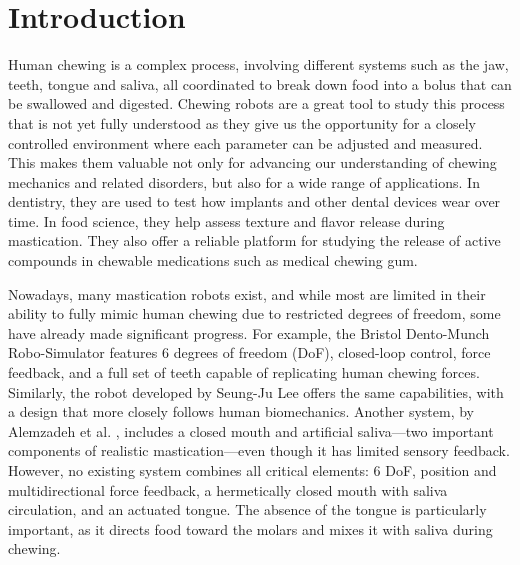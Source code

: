 \section{Introduction}


Human chewing is a complex process, involving different systems such as the jaw, teeth, tongue and saliva, all coordinated to break down food into 
a bolus that can be swallowed and digested. Chewing robots are a great tool to study this process that is not yet fully understood as they give us the opportunity 
for a closely controlled environment where each parameter can be adjusted and measured. This makes them valuable not only for advancing our understanding of 
chewing mechanics and related disorders, but also for a wide range of applications. In dentistry, they are used to test how implants and other dental devices
 wear over time. In food science, they help assess texture and flavor release during mastication. They also offer a reliable platform for studying the release of 
 active compounds in chewable medications such as medical chewing gum.

Nowadays, many mastication robots exist, and while most are limited in their ability to fully mimic human chewing due to restricted degrees of freedom, 
some have already made significant progress. For example, the Bristol Dento-Munch Robo-Simulator \cite{BristolChewingRobot} features 6 degrees of freedom 
(DoF), closed-loop control, force feedback, and a full set of teeth capable of replicating human chewing forces. Similarly, the robot developed by Seung-Ju 
Lee \cite{ChewingRobotLinearActuator} offers the same capabilities, with a design that more closely follows human biomechanics. Another system, by Alemzadeh 
et al. \cite{ChewingRobotGums}, includes a closed mouth and artificial saliva—two important components of realistic mastication—even though it has limited 
sensory feedback. However, no existing system combines all critical elements: 6 DoF, position and multidirectional force feedback, a hermetically closed 
mouth with saliva circulation, and an actuated tongue. The absence of the tongue is particularly important, as it directs food toward the molars and mixes 
it with saliva during chewing.

